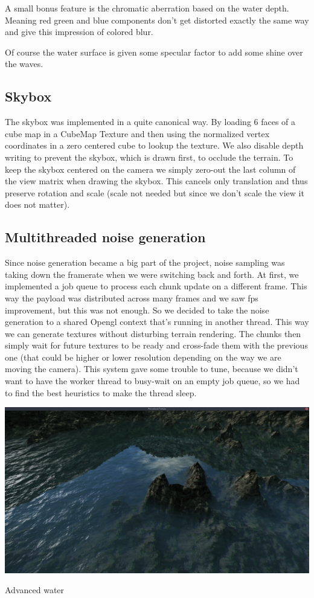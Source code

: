 \documentclass[11pt]{article}
\begin{document}
A small bonus feature is the chromatic aberration based on the water depth.
Meaning red green and blue components don't get distorted exactly the same way
and give this impression of colored blur.

Of course the water surface is given some specular factor to add some shine over
the waves.

\subsection{Skybox}

The skybox was implemented in a quite canonical way. By loading 6 faces of a cube
map in a CubeMap Texture and then using the normalized vertex coordinates in a
zero centered cube to lookup the texture. We also disable depth writing to
prevent the skybox, which is drawn first, to occlude the terrain. To keep the
skybox centered on the camera we simply zero-out the last column of the view
matrix when drawing the skybox. This cancels only translation and thus preserve
rotation and scale (scale not needed but since we don't scale the view it does
not matter).

\subsection{Multithreaded noise generation}

Since noise generation became a big part of the project, noise sampling was
taking down the framerate when we were switching back and forth. At first,
we implemented a job queue to process each chunk update on a different frame.
This way the payload was distributed across many frames and we saw fps
improvement, but this was not enough. So we decided to take the noise generation
to a shared Opengl context that's running in another thread. This way we can
generate textures without disturbing terrain rendering. The chunks then simply
wait for future textures to be ready and cross-fade them with the previous one
(that could be higher or lower resolution depending on the way we are moving the
camera). This system gave some trouble to tune, because we didn't want to have
the worker thread to busy-wait on an empty job queue, so we had to find the best
heuristics to make the thread sleep.

\begin{center}
\includegraphics[width=\textwidth]{screen06}
\caption{Advanced water}
\end{center} \\
\end{document}
